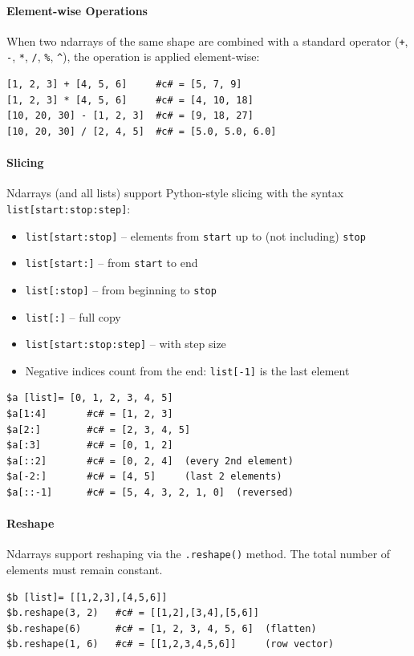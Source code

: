 \documentclass{report}
\begin{document}
\paragraph{Element-wise Operations}
When two ndarrays of the same shape are combined with a standard operator (\texttt{+}, \texttt{-}, \texttt{*}, \texttt{/}, \texttt{\%}, \texttt{\^{}}), the operation is applied element-wise:
\begin{verbatim}
[1, 2, 3] + [4, 5, 6]     #c# = [5, 7, 9]
[1, 2, 3] * [4, 5, 6]     #c# = [4, 10, 18]
[10, 20, 30] - [1, 2, 3]  #c# = [9, 18, 27]
[10, 20, 30] / [2, 4, 5]  #c# = [5.0, 5.0, 6.0]
\end{verbatim}

\paragraph{Slicing}
Ndarrays (and all lists) support Python-style slicing with the syntax \texttt{list[start:stop:step]}:
\begin{itemize}
\item \texttt{list[start:stop]} -- elements from \texttt{start} up to (not including) \texttt{stop}
\item \texttt{list[start:]} -- from \texttt{start} to end
\item \texttt{list[:stop]} -- from beginning to \texttt{stop}
\item \texttt{list[:]} -- full copy
\item \texttt{list[start:stop:step]} -- with step size
\item Negative indices count from the end: \texttt{list[-1]} is the last element
\end{itemize}
\begin{verbatim}
$a [list]= [0, 1, 2, 3, 4, 5]
$a[1:4]       #c# = [1, 2, 3]
$a[2:]        #c# = [2, 3, 4, 5]
$a[:3]        #c# = [0, 1, 2]
$a[::2]       #c# = [0, 2, 4]  (every 2nd element)
$a[-2:]       #c# = [4, 5]     (last 2 elements)
$a[::-1]      #c# = [5, 4, 3, 2, 1, 0]  (reversed)
\end{verbatim}

\paragraph{Reshape}
Ndarrays support reshaping via the \texttt{.reshape()} method. The total number of elements must remain constant.
\begin{verbatim}
$b [list]= [[1,2,3],[4,5,6]]
$b.reshape(3, 2)   #c# = [[1,2],[3,4],[5,6]]
$b.reshape(6)      #c# = [1, 2, 3, 4, 5, 6]  (flatten)
$b.reshape(1, 6)   #c# = [[1,2,3,4,5,6]]     (row vector)
\end{verbatim}
\end{document}
